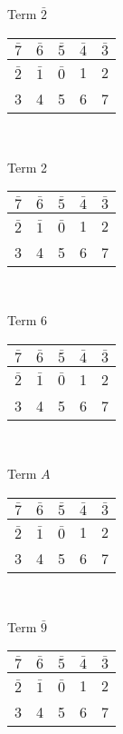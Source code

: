\documentclass[12 pt]{article}%
\begin{document}
\begin{multicols}{4}
\begin{center}
    Term $\bar 2$ \\
    \begin{tabular}{|c|c|c|c|c|}
      \hline
      $ \bar 7 $ & $ \bar 6 $ & $ \bar 5 $ & $\bar 4$ & $\bar 3 $ \\
      \hline
      $ \bar 2 $ & $ \bar 1 $ & $ \bar 0 $ & 1 & 2\\
      \hline
      3 & 4 & 5 & 6 & 7 \\
      \hline
    \end{tabular}\\
    \bigskip

    Term 2 \\
    \begin{tabular}{|c|c|c|c|c|}
      \hline
      $ \bar 7 $ & $ \bar 6 $ & $ \bar 5 $ & $\bar 4$ & $\bar 3 $ \\
      \hline
      $ \bar 2 $ & $ \bar 1 $ & $ \bar 0 $ & 1 & 2\\
      \hline
      3 & 4 & 5 & 6 & 7 \\
      \hline
    \end{tabular}\\
    \bigskip

    Term 6 \\
    \begin{tabular}{|c|c|c|c|c|}
      \hline
      $ \bar 7 $ & $ \bar 6 $ & $ \bar 5 $ & $\bar 4$ & $\bar 3 $ \\
      \hline
      $ \bar 2 $ & $ \bar 1 $ & $ \bar 0 $ & 1 & 2\\
      \hline
      3 & 4 & 5 & 6 & 7 \\
      \hline
    \end{tabular}\\
    \bigskip

    Term $A$ \\
    \begin{tabular}{|c|c|c|c|c|}
      \hline
      $ \bar 7 $ & $ \bar 6 $ & $ \bar 5 $ & $\bar 4$ & $\bar 3 $ \\
      \hline
      $ \bar 2 $ & $ \bar 1 $ & $ \bar 0 $ & 1 & 2\\
      \hline
      3 & 4 & 5 & 6 & 7 \\
      \hline
    \end{tabular}\\
    \bigskip

    Term $\bar 9$ \\
    \begin{tabular}{|c|c|c|c|c|}
      \hline
      $ \bar 7 $ & $ \bar 6 $ & $ \bar 5 $ & $\bar 4$ & $\bar 3 $ \\
      \hline
      $ \bar 2 $ & $ \bar 1 $ & $ \bar 0 $ & 1 & 2\\
      \hline
      3 & 4 & 5 & 6 & 7 \\
      \hline
    \end{tabular}\\
    \bigskip


\end{center}
\end{multicols}
\end{document}
